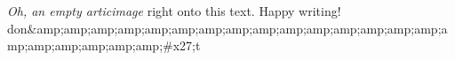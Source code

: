 \textit{Oh, an empty articimage} right onto this text. Happy writing! 
don&amp;amp;amp;amp;amp;amp;amp;amp;amp;amp;amp;amp;amp;amp;amp;amp;amp;amp;amp;amp;amp;#x27;t
